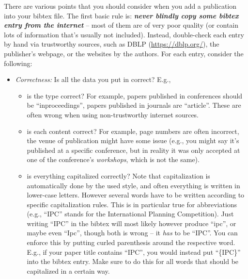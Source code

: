 There are various points that you should consider when you add a publication into your bibtex file. The first basic rule is: \textbf{\emph{never blindly copy some bibtex entry from the internet}} -- most of them are of very poor quality (or contain lots of information that's usually not included). Instead, double-check each entry by hand via trustworthy sources, such as DBLP (\url{https://dblp.org/}), the publisher's webpage, or the websites by the authors. For each entry, consider the following:
 
\begin{itemize}
  \item \emph{Correctness:} Is all the data you put in correct? E.g.,
  \begin{itemize}
    \item is the type correct? For example, papers published in conferences should be ``inproceedings'', papers published in journals are ``article''. These are often wrong when using non-trustworthy internet sources.
    \item is each content correct? For example, page numbers are often incorrect, the venue of publication might have some issue (e.g., you might say it's published at a specific conference, but in reality it was only accepted at one of the conference's \emph{workshops}, which is not the same).
    \item is everything capitalized correctly? Note that capitalization is automatically done by the used style, and often everything is written in lower-case letters. However several words have to be written according to specific capitalization rules. This is in particular true for abbreviations (e.g., ``IPC'' stands for the International Planning Competition). Just writing ``IPC'' in the bibtex will most likely however produce ``ipc'', or maybe even ``Ipc'', though both is wrong -- it \emph{has} to be ``IPC''. You can enforce this by putting curled parenthesis around the respective word. E.g., if your paper title contains ``IPC'', you would instead put ``\{IPC\}'' into the bibtex entry. Make sure to do this for all words that should be capitalized in a certain way.
  \end{itemize}


\end{itemize}
